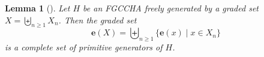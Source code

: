 \documentclass[11pt]{amsart}
\newtheorem{lemma}[theorem]{Lemma}
\theoremstyle{definition}
\numberwithin{equation}{section}
\newcommand{\FGCCHA}{\textsf{FGCCHA}\xspace}
\newcommand{\eric}[1]{\todo[size=\tiny,color=BurntOrange!50]{#1 \\ \hfill --- Eric}}
\begin{document}
\begin{lemma}[{\cite[Lemma 22]{PR04}}]
\label{lemma:primitive generators}
Let $H$ be an \FGCCHA freely generated by a graded set $X = \biguplus_{n \geq 1} X_{n}$.  
Then the graded set
\[
\mathbf{e}(X) = \biguplus_{n \ge 1} \{\mathbf{e}(x) \;|\; x \in X_{n}\}
\]
is a complete set of primitive generators of $H$.
\end{lemma}
\end{document}
